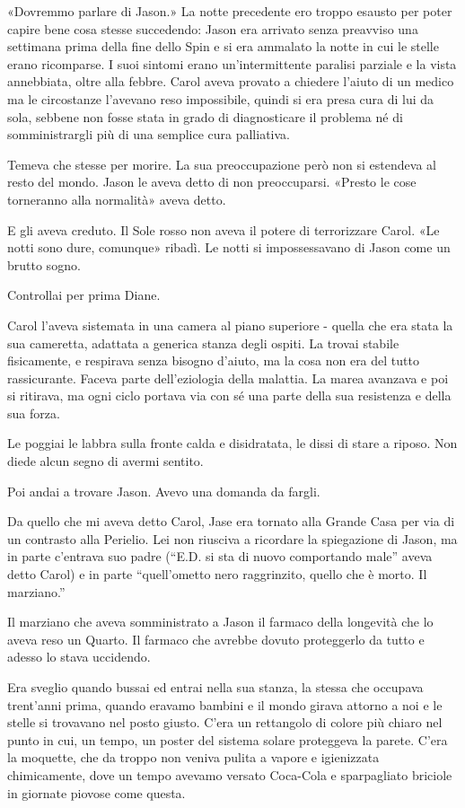«Dovremmo parlare di Jason.» La notte precedente ero troppo esausto per
poter capire bene cosa stesse succedendo: Jason era arrivato senza
preavviso una settimana prima della fine dello Spin e si era ammalato la
notte in cui le stelle erano ricomparse. I suoi sintomi erano
un'intermittente paralisi parziale e la vista annebbiata, oltre alla
febbre. Carol aveva provato a chiedere l'aiuto di un medico ma le
circostanze l'avevano reso impossibile, quindi si era presa cura di lui
da sola, sebbene non fosse stata in grado di diagnosticare il problema
né di somministrargli più di una semplice cura palliativa.

Temeva che stesse per morire. La sua preoccupazione però non si
estendeva al resto del mondo. Jason le aveva detto di non preoccuparsi.
«Presto le cose torneranno alla normalità» aveva detto.

E gli aveva creduto. Il Sole rosso non aveva il potere di terrorizzare
Carol. «Le notti sono dure, comunque» ribadì. Le notti si impossessavano
di Jason come un brutto sogno.

\separatorefiori

Controllai per prima Diane.

Carol l'aveva sistemata in una camera al piano superiore - quella che
era stata la sua cameretta, adattata a generica stanza degli ospiti. La
trovai stabile fisicamente, e respirava senza bisogno d'aiuto, ma la
cosa non era del tutto rassicurante. Faceva parte dell'eziologia della
malattia. La marea avanzava e poi si ritirava, ma ogni ciclo portava via
con sé una parte della sua resistenza e della sua forza.

Le poggiai le labbra sulla fronte calda e disidratata, le dissi di stare
a riposo. Non diede alcun segno di avermi sentito.

Poi andai a trovare Jason. Avevo una domanda da fargli.

Da quello che mi aveva detto Carol, Jase era tornato alla Grande Casa
per via di un contrasto alla Perielio. Lei non riusciva a ricordare la
spiegazione di Jason, ma in parte c'entrava suo padre (``E.D. si sta di
nuovo comportando male'' aveva detto Carol) e in parte ``quell'ometto
nero raggrinzito, quello che è morto. Il marziano.''

Il marziano che aveva somministrato a Jason il farmaco della longevità
che lo aveva reso un Quarto. Il farmaco che avrebbe dovuto proteggerlo
da tutto e adesso lo stava uccidendo.

\separatorefiori

Era sveglio quando bussai ed entrai nella sua stanza, la stessa che
occupava trent'anni prima, quando eravamo bambini e il mondo girava
attorno a noi e le stelle si trovavano nel posto giusto. C'era un
rettangolo di colore più chiaro nel punto in cui, un tempo, un poster
del sistema solare proteggeva la parete. C'era la moquette, che da
troppo non veniva pulita a vapore e igienizzata chimicamente, dove un
tempo avevamo versato Coca-Cola e sparpagliato briciole in giornate
piovose come questa.

